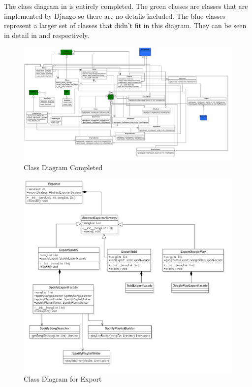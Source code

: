 \documentclass[12pt]{article}
\begin{document}
	The class diagram in  is entirely completed. The green classes are classes that are implemented by Django so there are no details included. The blue classes represent a larger set of classes that didn't fit in this diagram. They can be seen in detail in  and  respectively. 
	\begin{figure}[H]
		\centering
		\includegraphics[scale=0.25]{DiagramAddedSearch.png}
		\caption{Class Diagram Completed}
		\label{fig:classDiagCompleted}
	\end{figure}
	\begin{figure}[H]
		\centering
		\includegraphics[scale=0.25]{ExportClassDiagram.png}
		\caption{Class Diagram for Export}
		\label{fig:classDiagExport}
	\end{figure}
\end{document}
